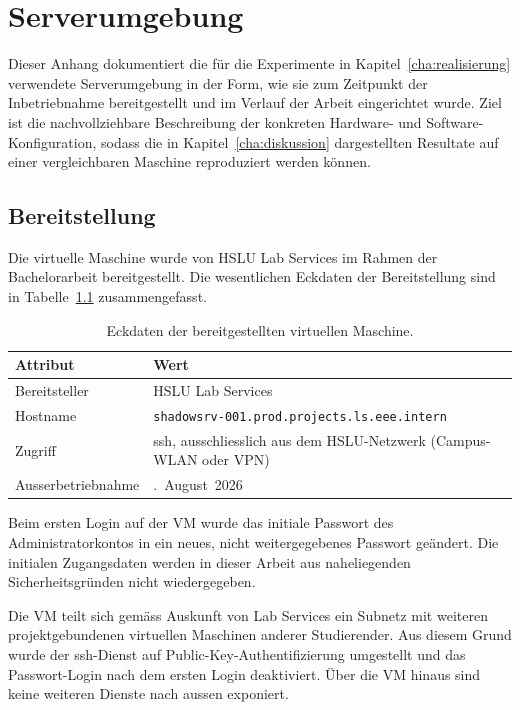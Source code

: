 \chapter{Serverumgebung}
\label{app:serverumgebung}

Dieser Anhang dokumentiert die für die Experimente in Kapitel~\ref{cha:realisierung} verwendete Serverumgebung in der Form, wie sie zum Zeitpunkt der Inbetriebnahme bereitgestellt und im Verlauf der Arbeit eingerichtet wurde.
Ziel ist die nachvollziehbare Beschreibung der konkreten Hardware- und Software-Konfiguration, sodass die in Kapitel~\ref{cha:diskussion} dargestellten Resultate auf einer vergleichbaren Maschine reproduziert werden können.

\section{Bereitstellung}
\label{app:serverumgebung_bereitstellung}

Die virtuelle Maschine wurde von HSLU Lab Services im Rahmen der Bachelorarbeit bereitgestellt.
Die wesentlichen Eckdaten der Bereitstellung sind in Tabelle~\ref{tab:serverumgebung_provisionierung} zusammengefasst.

\begin{table}[H]
\centering
\caption{Eckdaten der bereitgestellten virtuellen Maschine.}
\label{tab:serverumgebung_provisionierung}
\begin{tabularx}{\textwidth}{l>{\raggedright\arraybackslash}X}
\hline
Attribut & Wert \\
\hline
Bereitsteller & HSLU Lab Services \\
Hostname & \texttt{shadowsrv-001.prod.projects.ls.eee.intern} \\
Zugriff & \gls{ssh}, ausschliesslich aus dem HSLU-Netzwerk (Campus-WLAN oder VPN) \\
Ausserbetriebnahme & 1.~August~2026 \\
\hline
\end{tabularx}
\end{table}

Beim ersten Login auf der VM wurde das initiale Passwort des Administratorkontos in ein neues, nicht weitergegebenes Passwort geändert.
Die initialen Zugangsdaten werden in dieser Arbeit aus naheliegenden Sicherheitsgründen nicht wiedergegeben.

Die VM teilt sich gemäss Auskunft von Lab Services ein Subnetz mit weiteren projektgebundenen virtuellen Maschinen anderer Studierender.
Aus diesem Grund wurde der \gls{ssh}-Dienst auf Public-Key-Authentifizierung umgestellt und das Passwort-Login nach dem ersten Login deaktiviert.
Über die VM hinaus sind keine weiteren Dienste nach aussen exponiert.

